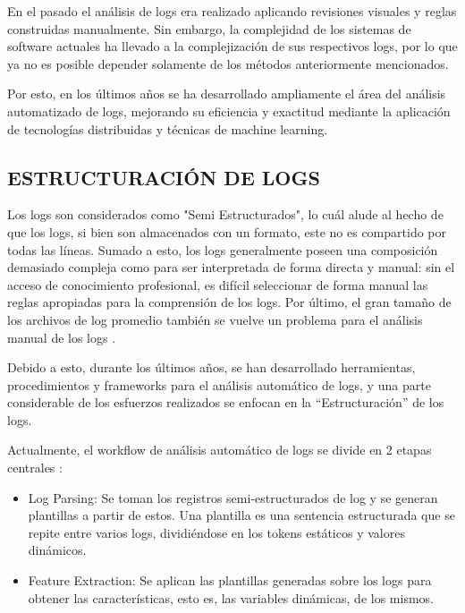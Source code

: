 En el pasado el análisis de logs era realizado aplicando revisiones visuales y reglas construidas manualmente. Sin embargo, la complejidad de los sistemas de software actuales ha llevado a la complejización de sus respectivos logs, por lo que ya no es posible depender solamente de los métodos anteriormente mencionados. \cite{ma2023automatic}

Por esto, en los últimos años se ha desarrollado ampliamente el área del análisis automatizado de logs, mejorando su eficiencia y exactitud mediante la aplicación de tecnologías distribuidas y técnicas de machine learning. \cite{ma2023automatic}

\subsection{ESTRUCTURACIÓN DE LOGS}
Los logs son considerados como "Semi Estructurados", lo cuál alude al hecho de que los logs, si bien son almacenados con un formato, este no es compartido por todas las líneas. Sumado a esto, los logs generalmente poseen una composición demasiado compleja como para ser interpretada de forma directa y manual: sin el acceso de conocimiento profesional, es difícil seleccionar de forma manual las reglas apropiadas para la comprensión de los logs. Por último, el gran tamaño de los archivos de log promedio también se vuelve un problema para el análisis manual de los logs \cite{ma2023automatic}.

Debido a esto, durante los últimos años, se han desarrollado herramientas, procedimientos y frameworks para el análisis automático de logs, y una parte considerable de los esfuerzos realizados se enfocan en la “Estructuración” de los logs.

Actualmente, el workflow de análisis automático de logs se divide en 2 etapas centrales \cite{ma2023automatic}:

\begin{itemize}
    \item Log Parsing: Se toman los registros semi-estructurados de log y se generan plantillas a partir de estos. Una plantilla es una sentencia estructurada que se repite entre varios logs, dividiéndose en los tokens estáticos y valores dinámicos. \cite{ma2023automatic}

    \item Feature Extraction: Se aplican las plantillas generadas sobre los logs para obtener las características, esto es, las variables dinámicas, de los mismos. \cite{ma2023automatic}

\end{itemize}

